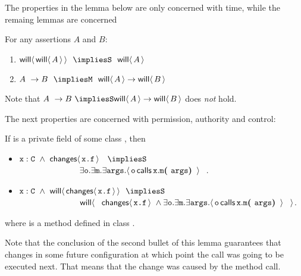 \documentclass[acmsmall,screen,anonymous,review]{acmart}
\begin{document}
The properties in the lemma below are only concerned with time, while the remaing lemmas are concerned 

\begin{lemma}[Time]
\label{lemma:time}
For any assertions $A$ and $B$:

\begin{enumerate}
\item
$\Future {\Future A}  \ \  \impliesS  \ \  \Future A$
\item 
$A \ \rightarrow B \  \    \impliesM  \ \    \Future A \rightarrow \Future B$
\end{enumerate}

\end{lemma}
Note that $A \ \rightarrow B \ \impliesS   \Future A \rightarrow \Future B$ does \emph{not} hold.




The next properties are concerned with permission, authority and control:

\begin{lemma}
\label{lemma:change}
\label{lemma:changes}
If  is a private field of some class , then

\begin{itemize}
\item
$\prg{x}:\prg{C}\ \wedge \   {\Changes{\prg{x.f}}} \ \ \ \impliesS $\\
$\strut\hspace{1in} 
     \exists \prg{o}.\exists \prg{m} .\exists \prg{args}.
 {\Calls {\prg{o}}   {\prg{m}} {\prg{x}}  {\prg{args}} } \ \ $. 

\item
$\prg{x}:\prg{C}\ \wedge \ \Future  {\Changes{\prg{x.f}}} \ \ \impliesS $\\
$\strut\hspace{1in} 
\Future {\ \  \Changes{\prg{x.f}} \ \wedge \exists \prg{o}.\exists \prg{m} .\exists \prg{args}.
 {\Calls {\prg{o}}   {\prg{m}} {\prg{x}}  {\prg{args}} } \ \ }$. 
\end{itemize}
where  is a method defined in class .

\end{lemma}

Note that the conclusion of the second bullet of this lemma guarantees that  changes in some future configuration at which point 
the call  was going to be executed next.  That means that the change was caused by the method call.
\end{document}
